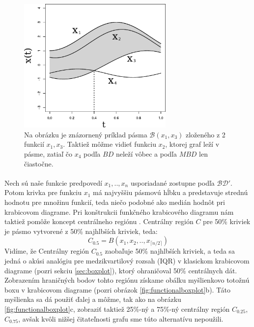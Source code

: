 \begin{figure}
	\centering
	\includegraphics[width = 3in]{band}
	\caption{ Na obrázku je znázornený príklad pásma $ \mathcal{B}(x_{1}, x_{3}) $ zloženého z 2 funkcií $ x_{1}, x_{3} $. Taktiež môžme vidieť funkciu $ x_{2} $, ktorej graf leží v pásme, zatiaľ čo $ x_{4} $ podľa $ BD $ neleží vôbec a podľa $ MBD $ len čiastočne. }
	\label{fig:band}
\end{figure}

\paragraph{}
Nech sú naše funkcie predpovedí $ x_{1},.., x_{n} $ usporiadané zostupne podľa $ \mathcal{BD}' $. Potom krivka pre funkciu $ x_{1} $ má najvyššiu pásmovú hĺbku a predstavuje strednú hodnotu pre množinu funkcií, teda niečo podobné ako medián hodnôt pri krabicovom diagrame. Pri konštrukcii funkčného krabicového diagramu nám taktiež pomôže koncept centrálneho regiónu \cite{Liu}. Centrálny región $ C $ pre 50\% kriviek je pásmo vytvorené z 50\% najhlbších kriviek, teda:
\[
	C_{0.5} = B(x_{1}, x_{2}, .., x_{\lceil n / 2 \rceil} )
\] 
Vidíme, že Centrálny región $ C_{0.5} $ zaobaľuje 50\% najhlbších kriviek, a teda sa jedná o akúsi analógiu pre medzikvartilový rozsah (IQR) v klasickom krabicovom diagrame (pozri sekciu \ref{sec:boxplot}), ktorý ohraničoval 50\% centrálnych dát. Zobrazením hraničných bodov tohto regiónu získame obálku myšlienkovo totožnú boxu v krabicovom diagrame (pozri obrázok \ref{fig:functionalboxplot}b). Táto myšlienka sa dá použiť ďalej a môžme, tak ako na obrázku \ref{fig:functionalboxplot}c, zobraziť taktiež 25\%-ný a 75\%-ný centrálny región $ C_{0.25} $, $ C_{0.75} $, avšak kvôli nižšej čitateľnosti grafu sme túto alternatívu nepoužili.

